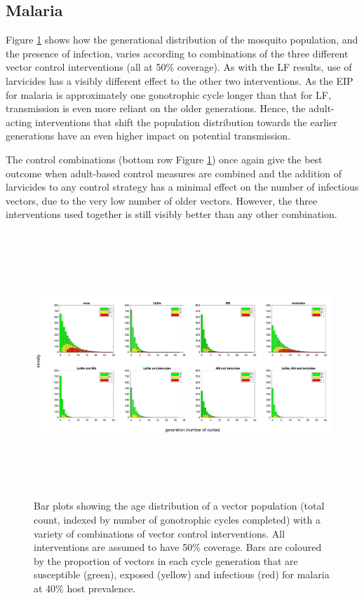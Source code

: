 \FloatBarrier

\subsection{Malaria}

Figure \ref{fig:8controls_Ma} shows how the generational distribution of the mosquito population, and the presence of infection, varies according to combinations of the three different vector control interventions (all at 50\% coverage). As with the LF results, use of larvicides has a visibly different effect to the other two interventions. As the EIP for malaria is approximately one gonotrophic cycle longer than that for LF, transmission is even more reliant on the older generations. Hence, the adult-acting interventions that shift the population distribution towards the earlier generations have an even higher impact on potential transmission.

The control combinations (bottom row Figure \ref{fig:8controls_Ma}) once again give the best outcome when adult-based control measures are combined and the addition of larvicides to any control strategy has a minimal effect on the number of infectious vectors, due to the very low number of older vectors. However, the three interventions used together is still visibly better than any other combination.

\begin{figure} 
\includegraphics[height=10cm]{Project/Figures/VectorModel/Malaria/populationhist_8controls.png}
\caption{Bar plots showing the age distribution of a vector population (total count, indexed by number of gonotrophic cycles completed) with a variety of combinations of vector control interventions. All interventions are assumed to have 50\% coverage. Bars are coloured by the proportion of vectors in each cycle generation that are susceptible (green), exposed (yellow) and infectious (red) for malaria at 40\% host prevalence.}
\label{fig:8controls_Ma}
\end{figure} 

